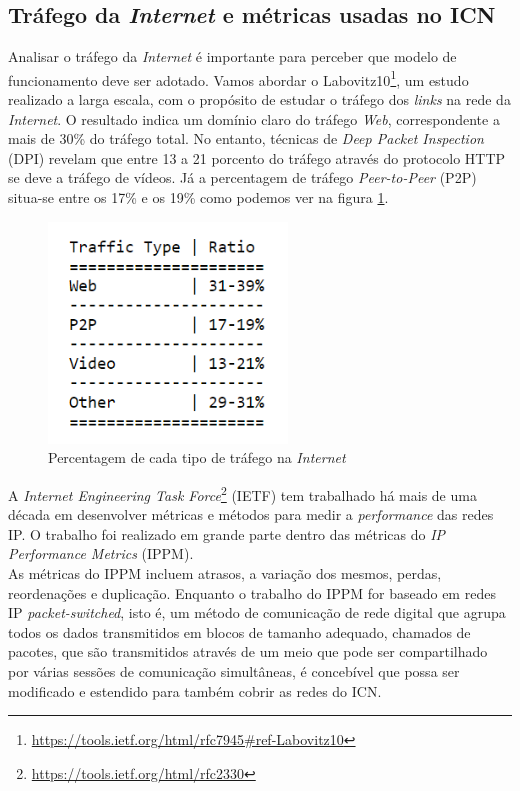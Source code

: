 \documentclass[conference]{IEEEtran}
\begin{document}
\subsection{Tr\'{a}fego da \textit{Internet} e m\'{e}tricas usadas no ICN}


Analisar o tr\'{a}fego da \textit{Internet} \'{e} importante para perceber que modelo de funcionamento deve ser adotado. Vamos abordar o Labovitz10\footnote{\url{https://tools.ietf.org/html/rfc7945#ref-Labovitz10}}, um estudo realizado a larga escala, com o prop\'{o}sito de estudar o tr\'{a}fego dos \textit{links} na rede da \textit{Internet}. O resultado indica um dom\'{i}nio claro do tr\'{a}fego \textit{Web}, correspondente a mais de 30\% do tr\'{a}fego total. No entanto, t\'{e}cnicas de \textit{Deep Packet Inspection} (DPI) revelam que entre 13 a 21 porcento do tr\'{a}fego atrav\'{e}s do protocolo HTTP se deve a tr\'{a}fego de v\'{i}deos. J\'{a} a percentagem de tr\'{a}fego \textit{Peer-to-Peer} (P2P) situa-se entre os 17\% e os 19\% como podemos ver na figura \ref{traffic}.\\

\begin{figure}[!t]
\centering
\includegraphics[width=2.5in]{sg30}
\caption{Percentagem de cada tipo de tr\'{a}fego na \textit{Internet}}
\label{traffic}
\end{figure}

A \textit{Internet Engineering Task Force}\footnote{\url{https://tools.ietf.org/html/rfc2330}} (IETF) tem trabalhado h\'{a} mais de uma d\'{e}cada em desenvolver m\'{e}tricas e m\'{e}todos para medir a \textit{performance} das redes IP. O trabalho foi realizado em grande parte dentro das m\'{e}tricas do \textit{IP Performance Metrics} (IPPM).\\

As m\'{e}tricas do IPPM incluem atrasos, a varia\c{c}\~{a}o dos mesmos, perdas, reordena\c{c}\~{o}es e duplica\c{c}\~{a}o. Enquanto o trabalho do IPPM for baseado em redes IP \textit{packet-switched}, isto \'{e}, um m\'{e}todo de comunica\c{c}\~{a}o de rede digital que agrupa todos os dados transmitidos em blocos de tamanho adequado, chamados de pacotes, que s\~{a}o transmitidos atrav\'{e}s de um meio que pode ser compartilhado por v\'{a}rias sess\~{o}es de comunica\c{c}\~{a}o simultâneas, \'{e} conceb\'{i}vel que possa ser modificado e estendido para tamb\'{e}m cobrir as redes do ICN.\\
\end{document}
